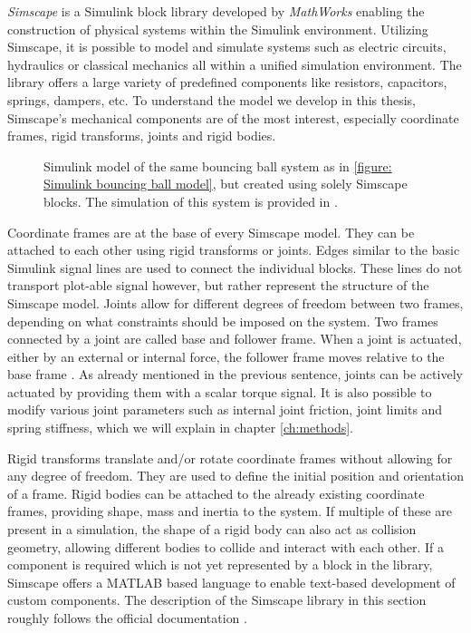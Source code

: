\textit{Simscape\textsuperscript{\texttrademark}} is a Simulink block library developed by \textit{MathWorks\textsuperscript{\textregistered}} enabling the construction of physical systems within the Simulink environment.
Utilizing Simscape, it is possible to model and simulate systems such as electric circuits, hydraulics or classical mechanics all within a unified simulation environment.
The library offers a large variety of predefined components like resistors, capacitors, springs, dampers, etc.
To understand the model we develop in this thesis, Simscape's mechanical components are of the most interest, especially coordinate frames, rigid transforms, joints and rigid bodies.

\begin{figure}[h!]
	\centering
	\centerline{}
	\caption[Simscape bouncing ball example]{Simulink model of the same bouncing ball system as in \ref{figure: Simulink bouncing ball model}, but created using solely Simscape blocks. The simulation of this system is provided in \cite{VIDEO 1}. }
	\label{figure: Simscape Bouncing Ball Example}
\end{figure}

Coordinate frames are at the base of every Simscape model.
They can be attached to each other using rigid transforms or joints.
Edges similar to the basic Simulink signal lines are used to connect the individual blocks.
These lines do not transport plot-able signal however, but rather represent the structure of the Simscape model.
Joints allow for different degrees of freedom between two frames, depending on what constraints should be imposed on the system.
Two frames connected by a joint are called base and follower frame.
When a joint is actuated, either by an external or internal force, the follower frame moves relative to the base frame \parencite{thilderkvist2015motion}.
As already mentioned in the previous sentence, joints can be actively actuated by providing them with a scalar torque signal.
It is also possible to modify various joint parameters such as internal joint friction, joint limits and spring stiffness, which we will explain in chapter \ref{ch:methods}.

Rigid transforms translate and/or rotate coordinate frames without allowing for any degree of freedom.
They are used to define the initial position and orientation of a frame.
Rigid bodies can be attached to the already existing coordinate frames, providing shape, mass and inertia to the system.
If multiple of these are present in a simulation, the shape of a rigid body can also act as collision geometry, allowing different bodies to collide and interact with each other.
If a component is required which is not yet represented by a block in the library, Simscape offers a MATLAB based language to enable text-based development of custom components.
The description of the Simscape library in this section roughly follows the official documentation \parencite{matlabSimscapeDocumentation}.

